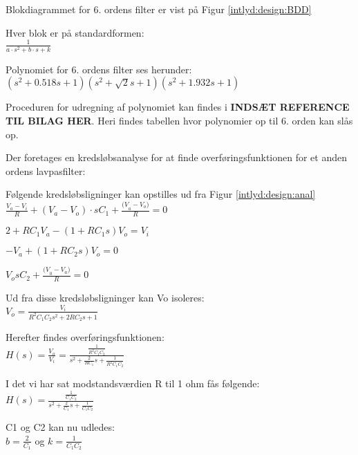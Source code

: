 Blokdiagrammet for 6. ordens filter er vist på Figur \ref{intlyd:design:BDD}


Hver blok er på standardformen:\\
$\frac { 1 }{ { a\cdot s }^{ 2 }+b\cdot s+k }$ 

Polynomiet for 6. ordens filter ses herunder:\\
$({ s }^{ 2 }+0.518s+1)({ s }^{ 2 }+\sqrt { 2 } s+1)({ s }^{ 2 }+1.932s+1)$

Proceduren for udregning af polynomiet kan findes i \textbf{INDSÆT REFERENCE TIL BILAG HER}. Heri findes tabellen hvor polynomier op til 6. orden kan slås op. 

Der foretages en kredsløbsanalyse for at finde overføringsfunktionen for et anden ordens lavpasfilter:


Følgende kredsløbsligninger kan opstilles ud fra Figur \ref{intlyd:design:anal}\\
$\frac { { V }_{ a }-{ V }_{ i } }{ R } +({ V }_{ a }-{ V }_{ o })\cdot s{ C }_{ 1 }+\frac { { (V }_{ a }-{ V }_{ o }) }{ R } =0$

$2+R{ C }_{ 1 }{ V }_{ a }-(1+R{ C }_{ 1 }s){ V }_{ o }={ V }_{ i }$

$-{ V }_{ a }+(1+R{ C }_{ 2 }s){ V }_{ o }=0$

${ V }_{ o }s{ C }_{ 2 }+\frac { { (V }_{ 0 }-{ V }_{ a }) }{ R } =0$

Ud fra disse kredsløbsligninger kan Vo isoleres: \\
${ V }_{ o }=\frac { { V }_{ i } }{ { R }^{ 2 }{ C }_{ 1 }{ C }_{ 2 }{ s }^{ 2 }+2R{ C }_{ 2 }s+1 }$

Herefter findes overføringsfunktionen: \\
$H(s)=\frac { { V }_{ o } }{ { V }_{ i } } =\frac { \frac { 1 }{ { R }^{ 2 }{ C }_{ 1 }{ C }_{ 2 } }  }{ { s }^{ 2 }+\frac { 2 }{ R{ C }_{ 1 } } s+\frac { 1 }{ { R }^{ 2 }{ C }_{ 1 }{ C }_{ 2 } }  }$ 

I det vi har sat modstandsværdien R til 1 ohm fås følgende:\\
$H(s)=\frac { \frac { 1 }{ { C }_{ 1 }{ C }_{ 2 } }  }{ { s }^{ 2 }+\frac { 2 }{ { C }_{ 1 } } s+\frac { 1 }{ { C }_{ 1 }{ C }_{ 2 } }  }$

C1 og C2 kan nu udledes: \\
$b=\frac { 2 }{ { C }_{ 1 } }$ og  $k=\frac { 1 }{ { C }_{ 1 }{ C }_{ 2 } }$

